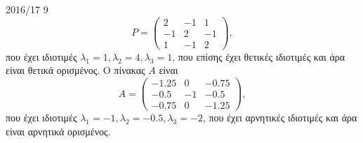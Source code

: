 \begin{solution}{2016/17 9}
    \[
        P =
        \begin{pmatrix}
            2 & -1 & 1 \\
            -1 & 2 & -1 \\
            1 & -1 & 2
        \end{pmatrix},
    \]
    που έχει ιδιοτιμές \( \lambda_1 = 1, \lambda_2 = 4, \lambda_3 = 1 \), που
    επίσης έχει θετικές ιδιοτιμές και άρα είναι θετικά ορισμένος. Ο πίνακας
    \( A \) είναι
    \[
        A =
        \begin{pmatrix}
            -1.25 & 0 & -0.75 \\
            -0.5 & -1 & -0.5 \\
            -0.75 & 0 & -1.25
        \end{pmatrix},
    \]
    που έχει ιδιοτιμές \( \lambda_1 = -1, \lambda_2 = -0.5, \lambda_3 = -2 \), που
    έχει αρνητικές ιδιοτιμές και άρα είναι αρνητικά ορισμένος.
\end{solution}
